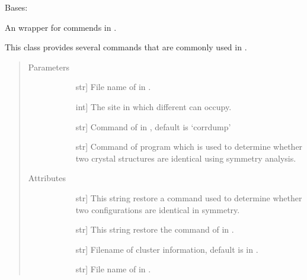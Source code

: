 \documentclass[letterpaper,10pt,english]{sphinxmanual}
\begin{document}
\begin{fulllineitems}
\label{\detokenize{pygace:pygace.ce.CE}}
Bases: 

An wrapper for commends in .

This class provides several commands that are commonly used in .
\begin{quote}\begin{description}
\item[{Parameters}] \leavevmode\begin{description}
\item[{}] \leavevmode{[}str{]}
File name of  in .

\item[{}] \leavevmode{[}int{]}
The site in which different can occupy.

\item[{}] \leavevmode{[}str{]}
Command of  in , default is ‘corrdump’

\item[{}] \leavevmode{[}str{]}
Command of program which is used to determine whether two crystal
structures are identical using symmetry analysis.

\end{description}

\item[{Attributes}] \leavevmode\begin{description}
\item[{}] \leavevmode{[}str{]}
This string restore a command used to determine whether two
configurations are identical in symmetry.

\item[{}] \leavevmode{[}str{]}
This string restore the command of  in .

\item[{}] \leavevmode{[}str{]}
Filename of cluster information, default is 
in .

\item[{}] \leavevmode{[}str{]}
File name of  in .


\end{description}
\end{description}
\end{quote}
\end{fulllineitems}
\end{document}
